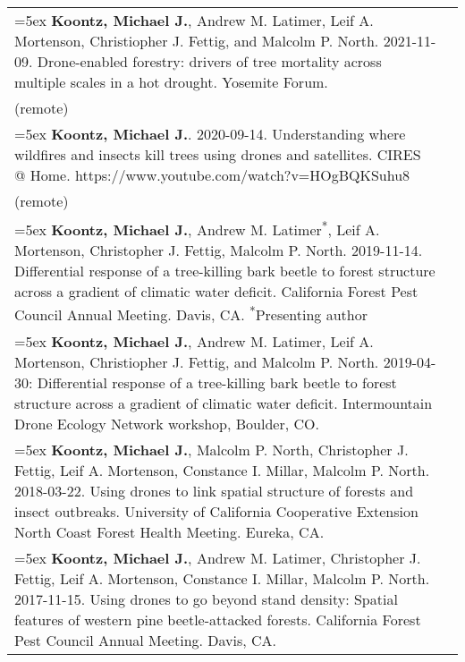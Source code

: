 \begin{longtable}{@{}>{\raggedright}p{5.25in} @{} >{\raggedleft}X@{}}

\hangindent=5ex \textbf{Koontz, Michael J.}, Andrew M. Latimer, Leif A. Mortenson, Christiopher J. Fettig, and Malcolm P. North. 2021-11-09. Drone-enabled forestry: drivers of tree mortality across multiple scales in a hot drought. Yosemite Forum. & 2021 \\ (remote) \tabularnewline

\hangindent=5ex \textbf{Koontz, Michael J.}. 2020-09-14. Understanding where wildfires and insects kill trees using drones and satellites. CIRES @ Home. https://www.youtube.com/watch?v=HOgBQKSuhu8 & 2020 \\ (remote) \tabularnewline

\hangindent=5ex \textbf{Koontz, Michael J.}, Andrew M. Latimer\textsuperscript{*}, Leif A. Mortenson, Christopher J. Fettig, Malcolm P. North. 2019-11-14. Differential response of a tree-killing bark beetle to forest structure across a gradient of climatic water deficit. California Forest Pest Council Annual Meeting. Davis, CA. \newline \textsuperscript{*}Presenting author & 2019 \tabularnewline

\hangindent=5ex \textbf{Koontz, Michael J.}, Andrew M. Latimer, Leif A. Mortenson, Christiopher J. Fettig, and Malcolm P. North. 2019-04-30: Differential response of a tree-killing bark beetle to forest structure across a gradient of climatic water deficit. Intermountain Drone Ecology Network workshop, Boulder, CO. & 2019 \tabularnewline

\hangindent=5ex \textbf{Koontz, Michael J.}, Malcolm P. North, Christopher J. Fettig, Leif A. Mortenson, Constance I. Millar, Malcolm P. North. 2018-03-22. Using drones to link spatial structure of forests and insect outbreaks. University of California Cooperative Extension North Coast Forest Health Meeting. Eureka, CA. & 2018 \tabularnewline

\hangindent=5ex \textbf{Koontz, Michael J.}, Andrew M. Latimer, Christopher J. Fettig, Leif A. Mortenson, Constance I. Millar, Malcolm P. North. 2017-11-15. Using drones to go beyond stand density: Spatial features of western pine beetle-attacked forests. California Forest Pest Council Annual Meeting. Davis, CA. & 2017

\end{longtable}
